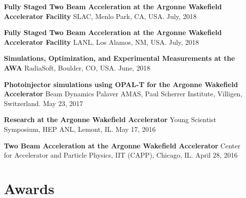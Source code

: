 \documentclass[11pt,a4paper,sans]{moderncv}        %
\begin{document}
\textbf{Fully  Staged Two Beam Acceleration at the Argonne Wakefield Accelerator
	Facility}\newline
SLAC, Menlo Park, CA, USA. July, 2018
\vspace{0.3em}

\textbf{Fully  Staged Two Beam Acceleration at the Argonne Wakefield Accelerator
	Facility}\newline
LANL, Los Alamos, NM, USA. July, 2018
\vspace{0.3em}

\textbf{Simulations, Optimization, and Experimental Measurements at the AWA}\newline
RadiaSoft, Boulder, CO, USA. June, 2018
\vspace{0.3em}

\textbf{Photoinjector simulations using OPAL-T for the Argonne Wakefield Accelerator}\newline
Beam Dynamics Palaver AMAS, Paul Scherrer Institute, Villigen, Switzerland. May 23, 2017 
\vspace{0.3em}

\textbf{Research at the Argonne Wakefield Accelerator}\newline
Young Scientist Symposium, HEP ANL, Lemont, IL. May 17, 2016 
\vspace{0.3em}

\textbf{Two Beam Acceleration at the Argonne Wakefield Accelerator}\newline
Center for Accelerator and Particle Physics, IIT (CAPP), Chicago, IL. April 28, 2016 

\section{Awards}

\end{document}
